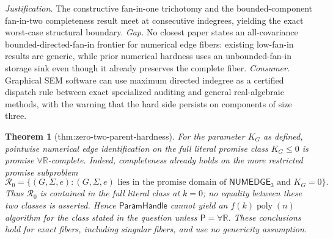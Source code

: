 \documentclass{article}
\newtheorem{theorem}{Theorem}
\begin{document}
\par\smallskip\noindent \textit{Justification.} The constructive fan-in-one trichotomy and the bounded-component fan-in-two completeness result meet at consecutive indegrees, yielding the exact worst-case structural boundary. \textit{Gap.} No closest paper states an all-covariance bounded-directed-fan-in frontier for numerical edge fibers: existing low-fan-in results are generic, while prior numerical hardness uses an unbounded-fan-in storage sink even though it already preserves the complete fiber. \textit{Consumer.} Graphical SEM software can use maximum directed indegree as a certified dispatch rule between exact specialized auditing and general real-algebraic methods, with the warning that the hard side persists on components of size three.

\begin{theorem}[thm:zero-two-parent-hardness]\label{thm:zero-two-parent-hardness}
For the parameter \(K_G\) as defined, pointwise numerical edge identification on the full literal promise class \(K_G\leq 0\) is promise \(\forall\mathbb R\)-complete.  Indeed, completeness already holds on the more restricted promise subproblem
\[
\mathcal R_0
=
\bigl\{(G,\Sigma,e):(G,\Sigma,e)\text{ lies in the promise domain of }\mathsf{NUMEDGE}_3\text{ and }K_G=0\bigr\}.
\]
Thus \(\mathcal R_0\) is contained in the full literal class at \(k=0\); no equality between these two classes is asserted.  Hence \(\mathsf{ParamHandle}\) cannot yield an \(f(k)\operatorname{poly}(n)\) algorithm for the class stated in the question unless \(\mathsf P=\forall\mathbb R\).  These conclusions hold for exact fibers, including singular fibers, and use no genericity assumption.
\end{theorem}
\end{document}
